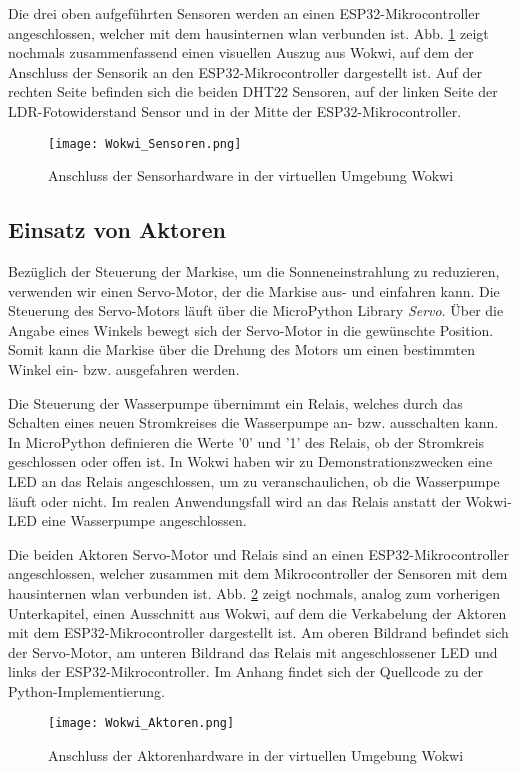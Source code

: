 Die drei oben aufgeführten Sensoren werden an einen ESP32-Mikrocontroller angeschlossen, welcher mit dem hausinternen \gls{wlan} verbunden ist. Abb. \ref{fig:wokwi_sensoren} zeigt nochmals zusammenfassend einen visuellen Auszug aus Wokwi, auf dem der Anschluss der Sensorik an den ESP32-Mikrocontroller dargestellt ist. Auf der rechten Seite befinden sich die beiden DHT22 Sensoren, auf der linken Seite der LDR-Fotowiderstand Sensor und in der Mitte der ESP32-Mikrocontroller.

\begin{figure}[h]
    \centering
    \texttt{[image: Wokwi\_Sensoren.png]}
    \caption{Anschluss der Sensorhardware in der virtuellen Umgebung Wokwi}\label{fig:wokwi_sensoren}
\end{figure}

\subsection{Einsatz von Aktoren}
Bezüglich der Steuerung der Markise, um die Sonneneinstrahlung zu reduzieren, verwenden wir einen Servo-Motor, der die Markise aus- und einfahren kann. Die Steuerung des Servo-Motors läuft über die MicroPython Library \textit{Servo}. Über die Angabe eines Winkels bewegt sich der Servo-Motor in die gewünschte Position. Somit kann die Markise über die Drehung des Motors um einen bestimmten Winkel ein- bzw. ausgefahren werden.

Die Steuerung der Wasserpumpe übernimmt ein Relais, welches durch das Schalten eines neuen Stromkreises die Wasserpumpe an- bzw. ausschalten kann. In MicroPython definieren die Werte '0' und '1' des Relais, ob der Stromkreis geschlossen oder offen ist. In Wokwi haben wir zu Demonstrationszwecken eine LED an das Relais angeschlossen, um zu veranschaulichen, ob die Wasserpumpe läuft oder nicht. Im realen Anwendungsfall wird an das Relais anstatt der Wokwi-LED eine Wasserpumpe angeschlossen.

Die beiden Aktoren Servo-Motor und Relais sind an einen ESP32-Mikrocontroller angeschlossen, welcher zusammen mit dem Mikrocontroller der Sensoren mit dem hausinternen \gls{wlan} verbunden ist. Abb. \ref{fig:wokwi_aktoren} zeigt nochmals, analog zum vorherigen Unterkapitel, einen Ausschnitt aus Wokwi, auf dem die Verkabelung der Aktoren mit dem ESP32-Mikrocontroller dargestellt ist. Am oberen Bildrand befindet sich der Servo-Motor, am unteren Bildrand das Relais mit angeschlossener LED und links der ESP32-Mikrocontroller. Im Anhang findet sich der Quellcode zu der Python-Implementierung.

\begin{figure}[h]
    \centering
    \texttt{[image: Wokwi\_Aktoren.png]}
    \caption{Anschluss der Aktorenhardware in der virtuellen Umgebung Wokwi}\label{fig:wokwi_aktoren}
\end{figure}
